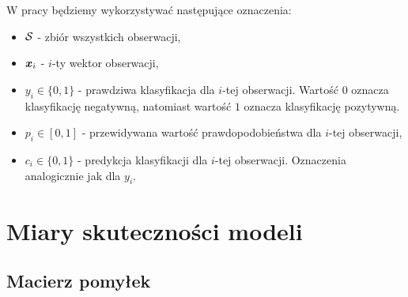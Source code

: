 \documentclass[inzynierska]{pwr_wmat_praca_dyplomowa}
\theoremstyle{plain}
\numberwithin{theorem}{chapter}
\theoremstyle{definition}
\numberwithin{theorem}{chapter}
\begin{document}
W pracy będziemy wykorzystywać następujące oznaczenia:
\begin{itemize}
	\item $\mathcal{S}$ - zbiór wszystkich obserwacji,
	\item $\boldsymbol{x}_{i}$ - $i$-ty wektor obserwacji,
	\item $y_i \in \{0,1\}$ - prawdziwa klasyfikacja dla $i$-tej obserwacji. Wartość $0$ oznacza klasyfikację negatywną, natomiast wartość $1$ oznacza klasyfikację pozytywną.
	\item $p_i \in [0,1]$ - przewidywana wartość prawdopodobieństwa dla $i$-tej obserwacji,
	\item $c_i \in \{0,1\} $ - predykcja klasyfikacji dla $i$-tej obserwacji. Oznaczenia analogicznie jak dla $y_i$.
\end{itemize}

\section{Miary skuteczności modeli}

\subsection{Macierz pomyłek}
\end{document}
